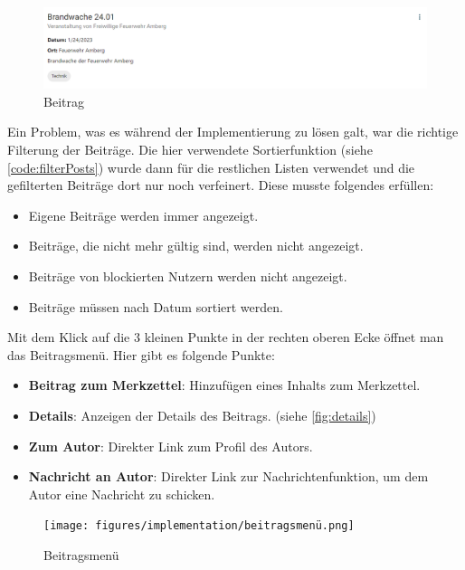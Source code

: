 \begin{figure}[ht!]
    \begin{centering}
        \includegraphics[width=.8\textwidth]{figures/implementation/beitrag.png}
        \caption{Beitrag}
        \label{fig:beitrag}
    \end{centering}
\end{figure}

Ein Problem, was es während der Implementierung zu lösen galt, war die richtige Filterung der Beiträge. Die hier verwendete Sortierfunktion (siehe \ref{code:filterPosts}) wurde dann für die restlichen Listen verwendet und die gefilterten Beiträge dort nur noch verfeinert.
Diese musste folgendes erfüllen:

\begin{itemize}
    \item Eigene Beiträge werden immer angezeigt.
    \item Beiträge, die nicht mehr gültig sind, werden nicht angezeigt.
    \item Beiträge von blockierten Nutzern werden nicht angezeigt.
    \item Beiträge müssen nach Datum sortiert werden.
\end{itemize}

Mit dem Klick auf die 3 kleinen Punkte in der rechten oberen Ecke öffnet man das Beitragsmenü. Hier gibt es folgende Punkte:

\begin{itemize}
    \item \textbf{Beitrag zum Merkzettel}: Hinzufügen eines Inhalts zum Merkzettel.
    \item \textbf{Details}: Anzeigen der Details des Beitrags. (siehe \ref{fig:details})
    \item \textbf{Zum Autor}: Direkter Link zum Profil des Autors.
    \item \textbf{Nachricht an Autor}: Direkter Link zur Nachrichtenfunktion, um dem Autor eine Nachricht zu schicken.
\end{itemize}

\begin{figure}[ht!]
    \begin{centering}
        \texttt{[image: figures/implementation/beitragsmenü.png]}
        \caption{Beitragsmenü}
        \label{fig:beitragsmenü}
    \end{centering}
\end{figure}

